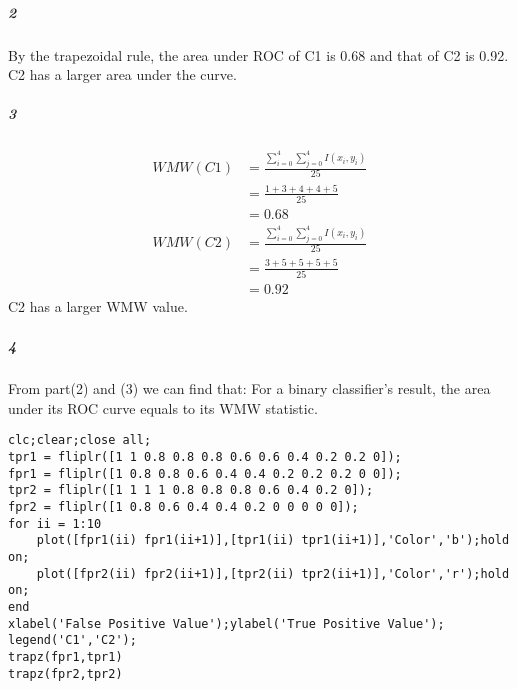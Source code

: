 \documentclass[22pt]{article}
\begin{document}
	\subparagraph{2} By the trapezoidal rule, the area under ROC of C1 is 0.68 and that of C2 is 0.92. C2 has a larger area under the curve.

	\subparagraph{3} 
	\begin{align}
		WMW(C1) & = \frac{\sum_{i=0}^{4}\sum_{j=0}^{4}I(x_i,y_i)}{25}\\
		& = \frac{1+3+4+4+5}{25}\\
		& = 0.68
	\end{align}
	\begin{align}
		WMW(C2) & = \frac{\sum_{i=0}^{4}\sum_{j=0}^{4}I(x_i,y_i)}{25}\\
		& = \frac{3+5+5+5+5}{25}\\
		& = 0.92
	\end{align}
	C2 has a larger WMW value.

	\subparagraph{4} From part(2) and (3) we can find that: For a binary classifier's result, the area under its ROC curve equals to its WMW statistic.

	\begin{lstlisting}
clc;clear;close all;
tpr1 = fliplr([1 1 0.8 0.8 0.8 0.6 0.6 0.4 0.2 0.2 0]);
fpr1 = fliplr([1 0.8 0.8 0.6 0.4 0.4 0.2 0.2 0.2 0 0]);
tpr2 = fliplr([1 1 1 1 0.8 0.8 0.8 0.6 0.4 0.2 0]);
fpr2 = fliplr([1 0.8 0.6 0.4 0.4 0.2 0 0 0 0 0]);
for ii = 1:10
    plot([fpr1(ii) fpr1(ii+1)],[tpr1(ii) tpr1(ii+1)],'Color','b');hold on;
    plot([fpr2(ii) fpr2(ii+1)],[tpr2(ii) tpr2(ii+1)],'Color','r');hold on;
end
xlabel('False Positive Value');ylabel('True Positive Value');
legend('C1','C2');
trapz(fpr1,tpr1)
trapz(fpr2,tpr2)
	\end{lstlisting}
\end{document}
